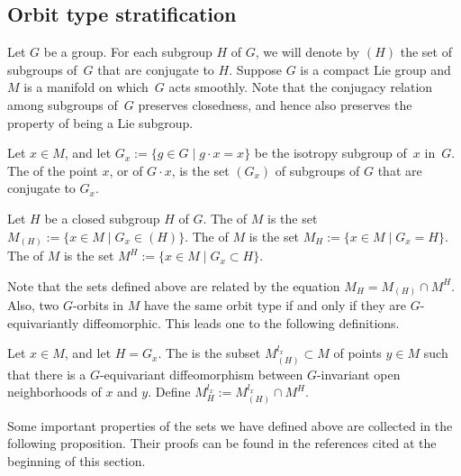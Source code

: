 \subsection{Orbit type stratif\/ication}

Let $G$ be a group.  For each subgroup $H$ of $G$, we will denote by $(H)$ the set of subgroups of~$G$ that are conjugate to $H$.  Suppose $G$ is a compact Lie group and $M$ is a manifold on which~$G$ acts smoothly.  Note that the conjugacy relation among subgroups of~$G$ preserves closedness, and hence also preserves the property of being a Lie subgroup.

\begin{Definition}
Let $x \in M$, and let $G_x := \{ g \in G \mid g \cdot x = x \}$ be the isotropy subgroup of~$x$ in~$G$.  The  of the point $x$, or of $G \cdot x$, is the set $(G_x)$ of subgroups of $G$ that are conjugate to $G_x$.

Let $H$ be a closed subgroup $H$ of $G$.  The  of $M$ is the set $M_{(H)} := \{ x \in M \mid G_x \in (H) \}$.  The  of $M$ is the set $M_H := \{ x \in M \mid G_x = H \}$.  The  of $M$ is the set $M^H := \{ x \in M \mid G_x \subset H \}$.
\end{Definition}

Note that the sets def\/ined above are related by the equation $M_H = M_{(H)} \cap M^H$.
Also, two $G$-orbits in $M$ have the same orbit type if and only if they are $G$-equivariantly dif\/feomorphic.  This leads one to the following def\/initions.


\begin{Definition}
Let $x \in M$, and let $H = G_x$.  The  is the subset $M_{(H)}^{l_x} \subset M$ of points $y \in M$ such that there is a $G$-equivariant dif\/feomorphism between $G$-invariant open neighborhoods of $x$ and $y$.  Def\/ine $M_H^{l_x} := M_{(H)}^{l_x} \cap M^H$.
\end{Definition}


Some important properties of the sets we have def\/ined above are collected in the following proposition.  Their proofs can be found in the references cited at the beginning of this section.


